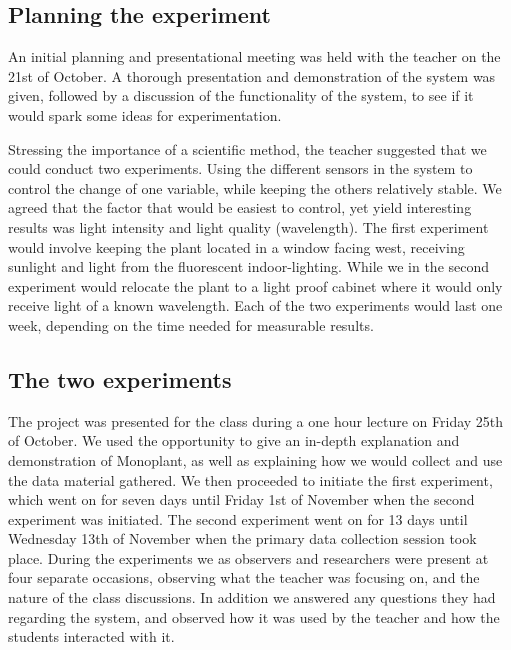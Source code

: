 \subsection{Planning the experiment}
An initial planning and presentational meeting was held with the teacher on the 21st of October. A thorough presentation and demonstration of the system was given, followed by a discussion of the functionality of the system, to see if it would spark some ideas for experimentation. 

Stressing the importance of a scientific method, the teacher suggested that we could conduct two experiments. Using the different sensors in the system to control the change of one variable, while keeping the others relatively stable. We agreed that the factor that would be easiest to control, yet yield interesting results was light intensity and light quality (wavelength). The first experiment would involve keeping the plant located in a window facing west, receiving sunlight and light from the fluorescent indoor-lighting. While we in the second experiment would relocate the plant to a light proof cabinet where it would only receive light of a known wavelength. Each of the two experiments would last one week, depending on the time needed for measurable results.

\subsection{The two experiments}
The project was presented for the class during a one hour lecture on Friday 25th of October. We used the opportunity to give an in-depth explanation and demonstration of Monoplant, as well as explaining how we would collect and use the data material gathered. We then proceeded to initiate the first experiment, which went on for seven days until Friday 1st of November when the second experiment was initiated. The second experiment went on for 13 days until Wednesday 13th of November when the primary data collection session took place. During the experiments we as observers and researchers were present at four separate occasions, observing what the teacher was focusing on, and the nature of the class discussions. In addition we answered any questions they had regarding the system, and observed how it was used by the teacher and how the students interacted with it. 

